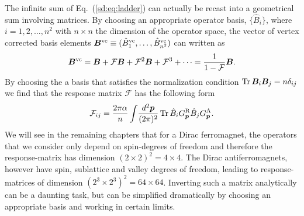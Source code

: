 The infinite sum of Eq.~(\ref{sd:eq:ladder}) can actually be recast into a geometrical sum involving matrices. By choosing an appropriate operator basis, $\{\hat{B}_i\}$, where $i=1,2,\dots,n^2$ with $n\times n$ the dimension of the operator space, the vector of vertex corrected basis elements $\boldsymbol{B}^\text{vc}\equiv(\hat{B}_1^\text{vc},\dots,\hat{B}_{{n^2}}^\text{vc})$ can written as
\begin{equation}
	\boldsymbol{B}^\text{vc} = \boldsymbol{B}+\mathcal{F}\boldsymbol{B}+\mathcal{F}^2\boldsymbol{B}+\mathcal{F}^3+\cdots = \frac{1}{1-\mathcal{F}}\boldsymbol{B}.
\end{equation}
By choosing the a basis that satisfies the normalization condition $\operatorname{Tr}\boldsymbol{B}_i\boldsymbol{B}_j=n\delta_{ij}$ we find that the response matrix $\mathcal{F}$ has the following form
\begin{equation}
	\mathcal{F}_{ij} = \frac{2\pi\alpha}{n} \int\!\frac{d^2\boldsymbol{p}}{(2\pi)^2}\operatorname{Tr} \hat{B}_i G^\text{R}_{\boldsymbol{p}} \hat{B}_j G^\text{A}_{\boldsymbol{p}}.
\end{equation}
We will see in the remaining chapters that for a Dirac ferromagnet, the operators that we consider only depend on spin-degrees of freedom and therefore the response-matrix has dimension $(2\times2)^2=4\times4$. The Dirac antiferromagnets, however have spin, sublattice and valley degrees of freedom, leading to response-matrices of dimension $(2^3\times2^3)^2=64\times64$. Inverting such a matrix analytically can be a daunting task, but can be simplified dramatically by choosing an appropriate basis and working in certain limits. 


